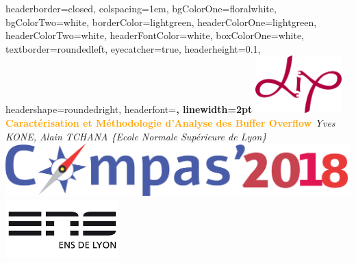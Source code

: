 \documentclass[landscape,a0paper,fontscale=0.3]{baposter} %
\begin{document}
\begin{poster}
{
headerborder=closed, %
colspacing=1em, %
bgColorOne=floralwhite, %
bgColorTwo=white, %
borderColor=lightgreen, %
headerColorOne=lightgreen, %
headerColorTwo=white, %
headerFontColor=white, %
boxColorOne=white, %
textborder=roundedleft, %
eyecatcher=true, %
headerheight=0.1\textheight, %
headershape=roundedright, %
headerfont=\large\bf\textsc, %
linewidth=2pt %
}
%
{\includegraphics[height=6em]{logo_lip_HD}} %
{\bf\Large\textcolor{orange}{Caractérisation et Méthodologie d'Analyse des Buffer Overflow }\vspace{0.2em}} %
{\textsl{ \small Yves KONE, Alain TCHANA \{Ecole Normale Supérieure de Lyon\}\\ \vspace{0.2em}
\includegraphics[width=0.2\linewidth]{compas18}}} %
{\includegraphics[height=6em]{enslogo}} %


\end{poster}
\end{document}
